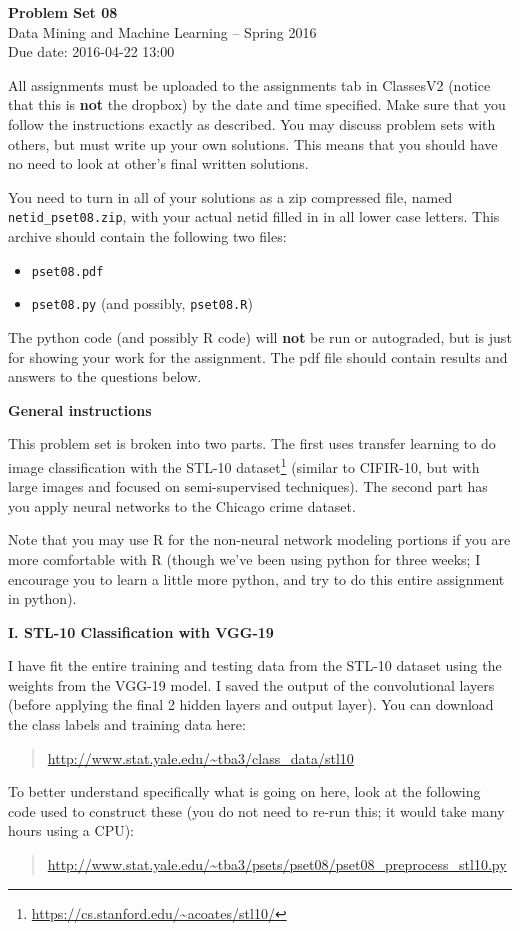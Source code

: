 \documentclass[12pt]{article}
\begin{document}
\begin{center}
{\bf Problem Set 08} \\
Data Mining and Machine Learning -- Spring 2016 \\
Due date: 2016-04-22 13:00
\end{center}

\medskip

All assignments must be uploaded to the assignments tab in ClassesV2
(notice that this is \textbf{not} the dropbox) by the date and time specified.
Make sure that you follow the instructions exactly as described.
You may discuss problem sets with others, but must write up your own
solutions. This means that you should have no need to look at other's
final written solutions.

You need to turn in all of your solutions as a zip compressed file, named
\texttt{netid\_pset08.zip}, with your actual netid filled in in all lower
case letters. This archive should contain the following two files:
\begin{itemize}
\item \texttt{pset08.pdf}
\item \texttt{pset08.py} (and possibly, \texttt{pset08.R})
\end{itemize}
The python code (and possibly R code) will \textbf{not} be run or autograded,
but is just for showing your work for the assignment. The pdf file should
contain results and answers to the questions below.

\medskip

\textbf{General instructions}

This problem set is broken into two parts. The first uses transfer
learning to do image classification with the STL-10
dataset\footnote{\url{https://cs.stanford.edu/~acoates/stl10/}} (similar
to CIFIR-10, but with large images and focused on semi-supervised
techniques). The second part has you apply neural networks to the
Chicago crime dataset.

Note that you may use R for the non-neural network modeling portions
if you are more comfortable with R (though we've been using python
for three weeks; I encourage you to learn a little more python, and
try to do this entire assignment in python).

\textbf{I. STL-10 Classification with VGG-19}

I have fit the entire training and testing data from the STL-10 dataset
using the weights from the VGG-19 model. I saved the output of the
convolutional layers (before applying the final 2 hidden layers and
output layer). You can download the class labels and training data
here:
\begin{quote}
\url{http://www.stat.yale.edu/~tba3/class_data/stl10}
\end{quote}
To better understand specifically what is going on here, look at the
following code used to construct these (you do not need to re-run this;
it would take many hours using a CPU):
\begin{quote}
\url{http://www.stat.yale.edu/~tba3/psets/pset08/pset08_preprocess_stl10.py}
\end{quote}
\end{document}
